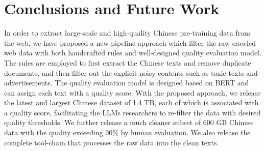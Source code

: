 \documentclass{article}
\newcommand\xrowht[2][0]{\addstackgap[.5\dimexpr#2\relax]{\vphantom{#1}}}
\begin{document}







\section{Conclusions and Future Work}
In order to extract large-scale and high-quality Chinese pre-training data from the web, we have proposed a new pipeline approach which filter the raw crawled web data with both handcrafted rules and well-designed quality evaluation model. The rules are employed to first extract the Chinese texts and remove duplicate documents, and then filter out the explicit noisy contents such as toxic texts and advertisements. The quality evaluation model is designed based on BERT and can assign each text with a quality score. With the proposed approach, we release the latest and largest Chinese dataset of 1.4 TB, each of which is associated with a quality score, facilitating the LLMs researchers to re-filter the data with desired quality thresholds. We further release a much cleaner subset of 600 GB Chinese data with the quality exceeding 90\% by human evaluation. We also release the complete tool-chain that processes the raw data into the clean texts.
\end{document}
